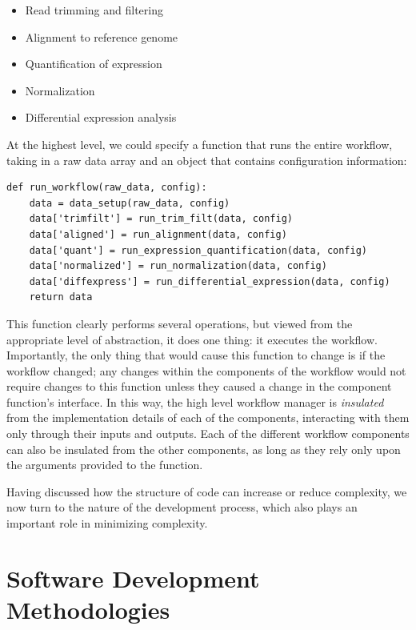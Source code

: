 \begin{itemize}
\item Read trimming and filtering
\item Alignment to reference genome
\item Quantification of expression
\item Normalization
\item Differential expression analysis
\end{itemize}

At the highest level, we could specify a function that runs the entire workflow, taking in a raw data array and an object that contains configuration information:

\begin{lstlisting}[style=Python]
def run_workflow(raw_data, config):
    data = data_setup(raw_data, config)
    data['trimfilt'] = run_trim_filt(data, config)
    data['aligned'] = run_alignment(data, config)
    data['quant'] = run_expression_quantification(data, config)
    data['normalized'] = run_normalization(data, config)
    data['diffexpress'] = run_differential_expression(data, config)
    return data
\end{lstlisting}

This function clearly performs several operations, but viewed from the appropriate level of abstraction, it does one thing: it executes the workflow.
Importantly, the only thing that would cause this function to change is if the workflow changed; any changes within the components of the workflow would not require changes to this function unless they caused a change in the component function's interface.
In this way, the high level workflow manager is \textit{insulated} from the implementation details of each of the components, interacting with them only through their inputs and outputs.
Each of the different workflow components can also be insulated from the other components, as long as they rely only upon the arguments provided to the function.

Having discussed how the structure of code can increase or reduce complexity, we now turn to the nature of the development process, which also plays an important role in minimizing complexity.

\section{Software Development Methodologies}


